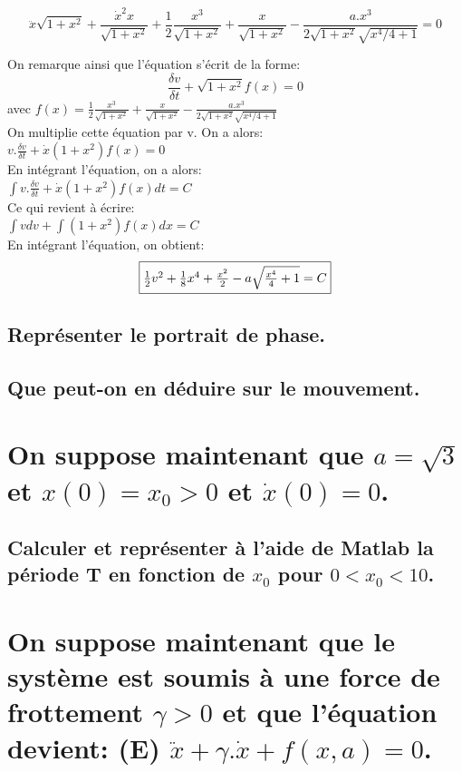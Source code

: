 \documentclass[10pt,a4paper]{article}
\begin{document}
\[  \ddot{x}\sqrt{1+x^2}+\frac{\dot{x}^2x}{\sqrt{1+x^2}} + \frac{1}{2}\frac{x^3}{\sqrt{1+x^2}} + \frac{x}{\sqrt{1+x^2}} - \frac{a.x^3}{2\sqrt{1+x^2}\sqrt{x^4/4+1}}=0 \]	

On remarque ainsi que l'équation s'écrit de la forme:\\
\[ \frac{\delta{v}}{\delta{t}} + \sqrt{1+x^2}f(x) = 0 \] avec $f(x)=  \frac{1}{2}\frac{x^3}{\sqrt{1+x^2}} + \frac{x}{\sqrt{1+x^2}} - \frac{a.x^3}{2\sqrt{1+x^2}\sqrt{x^4/4+1}}$ \\
On multiplie cette équation par v. On a alors:\\
$ v.\frac{\delta{v}}{\delta{t}} + \dot{x}(1+x^2)f(x) = 0$\\
En intégrant l'équation, on a alors:\\
$ \int v.\frac{\delta{v}}{\delta{t}} + \dot{x}(1+x^2)f(x) dt= C$\\
Ce qui revient à écrire:\\
$ \int vdv + \int (1+x^2)f(x)dx= C$\\
En intégrant l'équation, on obtient:\\
\[\fbox{$ \frac{1}{2}v^2 + \frac{1}{8}x^4 + \frac{x^2}{2} - a\sqrt{\frac{x^4}{4} + 1} = C  $}\]

 

	
\subsection{Représenter le portrait de phase.}
\subsection{Que peut-on en déduire sur le mouvement.}

\section{On suppose maintenant que $a=\sqrt{3}$ et $x(0)=x_0>0$ et $\dot{x}(0)=0$.}
\subsection{Calculer et représenter à l'aide de Matlab la période T en fonction de $x_0$ pour $0<x_0<10$.}

\section{On suppose maintenant que le système est soumis à une force de frottement $\gamma > 0$ et que l'équation devient: (E) $\ddot{x} + \gamma.\dot{x} + f(x,a) = 0$.}
\end{document}
